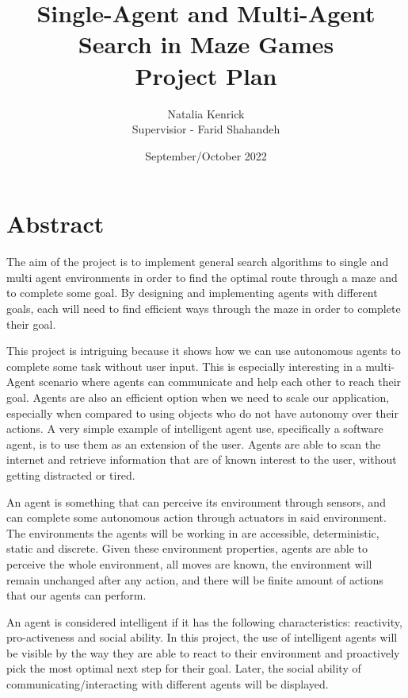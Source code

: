 \documentclass{article}
\title{Single-Agent and Multi-Agent Search in Maze Games \\ Project Plan}
\author{Natalia Kenrick\\\small Supervisior - Farid Shahandeh}
\date{September/October 2022}
\begin{document}
\begin{titlepage}
\maketitle
\end{titlepage}

\tableofcontents{}\newpage

\section{Abstract}

The aim of the project is to implement general search algorithms to single and multi agent environments in order to find the optimal route through a maze and to complete some goal. By designing and implementing agents with different goals, each will need to find efficient ways through the maze in order to complete their goal.

This project is intriguing because it shows how we can use autonomous agents to complete some task without user input. This is especially interesting in a multi-Agent scenario where agents can communicate and help each other to reach their goal. Agents are also an efficient option when we need to scale our application, especially when compared to using objects who do not have autonomy over their actions. A very simple example of intelligent agent use, specifically a software agent, is to use them as an extension of the user. Agents are able to scan the internet and retrieve information that are of known interest to the user, without getting distracted or tired.

An agent is something that can perceive its environment through sensors, and can complete some autonomous action through actuators in said environment. The environments the agents will be working in are accessible, deterministic, static and discrete. Given these environment properties, agents are able to perceive the whole environment, all moves are known, the environment will remain unchanged after any action, and there will be finite amount of actions that our agents can perform. 

An agent is considered intelligent if it has the following characteristics: reactivity, pro-activeness and social ability. In this project, the use of intelligent agents will be visible by the way they are able to react to their environment and proactively pick the most optimal next step for their goal. Later, the social ability of communicating/interacting with different agents will be displayed. 
\end{document}
